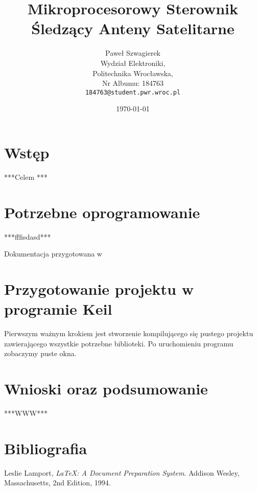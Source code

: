 \documentclass[titlepage]{mwart}
\begin{document}
\title{Mikroprocesorowy Sterownik Śledzący Anteny Satelitarne}
\author{Paweł Szwagierek\\
Wydział Elektroniki,\\
Politechnika Wrocławska,\\
Nr Albumu: 184763\\
\texttt{184763@student.pwr.wroc.pl}
}
\date{\today}
\maketitle
\tableofcontents
\clearpage

\section{Wstęp}
***Celem ***

\section{Potrzebne oprogramowanie}
***fffisdasd***

Dokumentacja przygotowana w \LaTeXe

\section{Przygotowanie projektu w programie Keil}
Pierwszym ważnym krokiem jest stworzenie kompilującego się pustego projektu zawierającego wszystkie potrzebne biblioteki. Po uruchomieniu programu zobaczymy puste okna.

\section{Wnioski oraz podsumowanie}
***WWW***
\section{Bibliografia}
\begin{thebibliography}{9}


Leslie Lamport,
\emph{\LaTeX: A Document Preparation System}.
Addison Wesley, Massachusetts,
2nd Edition,
1994.

\end{thebibliography} %
\end{document}
